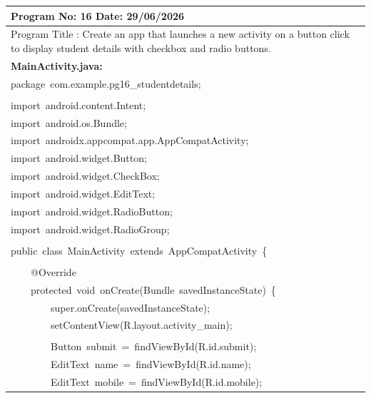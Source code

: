\documentclass[a4paper,12pt]{article}
\begin{document}
\noindent\begingroup
\renewcommand{\arraystretch}{1.1}
\begin{longtable}{|p{}|}
\hline\endfirsthead\hline\endhead\hline\endfoot\hline\endlastfoot
\rule{0pt}{13pt}Program No: 16 \hfill Date: 29/06/2026 \\
\hline
\rule{0pt}{13pt}Program Title : Create an app that launches a new activity on a button click to display student details with checkbox and radio buttons. \\
\hline
\rule{0pt}{13pt}\textbf{MainActivity.java:} \\
\hline
{\ttfamily\small package\ com.example.pg16\_studentdetails;} \\
\strut \\
{\ttfamily\small import\ android.content.Intent;} \\
{\ttfamily\small import\ android.os.Bundle;} \\
{\ttfamily\small import\ androidx.appcompat.app.AppCompatActivity;} \\
{\ttfamily\small import\ android.widget.Button;} \\
{\ttfamily\small import\ android.widget.CheckBox;} \\
{\ttfamily\small import\ android.widget.EditText;} \\
{\ttfamily\small import\ android.widget.RadioButton;} \\
{\ttfamily\small import\ android.widget.RadioGroup;} \\
\strut \\
{\ttfamily\small public\ class\ MainActivity\ extends\ AppCompatActivity\ \{} \\
\strut \\
{\ttfamily\small \ \ \ \ @Override} \\
{\ttfamily\small \ \ \ \ protected\ void\ onCreate(Bundle\ savedInstanceState)\ \{} \\
{\ttfamily\small \ \ \ \ \ \ \ \ super.onCreate(savedInstanceState);} \\
{\ttfamily\small \ \ \ \ \ \ \ \ setContentView(R.layout.activity\_main);} \\
\strut \\
{\ttfamily\small \ \ \ \ \ \ \ \ Button\ submit\ =\ findViewById(R.id.submit);} \\
{\ttfamily\small \ \ \ \ \ \ \ \ EditText\ name\ =\ findViewById(R.id.name);} \\
{\ttfamily\small \ \ \ \ \ \ \ \ EditText\ mobile\ =\ findViewById(R.id.mobile);} \\

\end{longtable}
\end{document}
